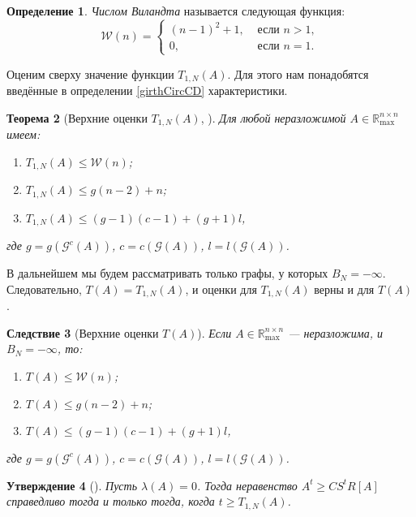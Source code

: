 \documentclass[12pt]{article}
\newtheorem{theorem}{Теорема}[section]
\newtheorem{proposition}[theorem]{Утверждение}
\newtheorem{corollary}[theorem]{Следствие}
\theoremstyle{definition}
\newtheorem{definition}[theorem]{Определение}
\begin{document}
\begin{definition}
\textit{Числом Виландта} называется следующая функция:
\begin{equation*}
\mathcal{W}(n) = \begin{cases}
(n - 1)^2 + 1, &\text{ если } n > 1, \\
0, & \text{ если } n = 1.
\end{cases}
\end{equation*}
\end{definition}

Оценим сверху значение функции $T_{1, N}(A)$. Для этого нам понадобятся введённые в определении \ref{girthCircCD} характеристики.

\begin{theorem} [Верхние оценки $T_{1, N}(A)$, {\cite[теорема 4.1]{15WeakCSRExpantion}}]

Для любой неразложимой $A \in \mathbb{R}_{\max}^{n \times n}$ имеем:
\begin{enumerate} 
    \item $T_{1, N}(A) \le \mathcal{W}(n)$;
    \item $T_{1, N}(A) \le g(n - 2) + n$;
    \item $T_{1, N}(A) \le (g - 1)(c - 1) + (g + 1) l$,
\end{enumerate}
где $g = g(\mathcal{G}^c(A))$, $c = c(\mathcal{G}(A))$, $l = l(\mathcal{G}(A))$.
\end{theorem}

В дальнейшем мы будем рассматривать только графы, у которых $B_N = -\infty$. Следовательно, $T(A) = T_{1, N}(A)$, и оценки для $T_{1, N}(A)$ верны и для $T(A)$.

\begin{corollary} [Верхние оценки $T(A)$]
\label{upperBounds}
Если $A \in \mathbb{R}_{\max}^{n \times n}$ --- неразложима, и $B_N = -\infty$, то:
\begin{enumerate} 
    \item $T(A) \le \mathcal{W}(n)$;
    \item $T(A) \le g(n - 2) + n$;
    \item $T(A) \le (g - 1)(c - 1) + (g + 1) l$,
\end{enumerate}
где $g = g(\mathcal{G}^c(A))$, $c = c(\mathcal{G}(A))$, $l = l(\mathcal{G}(A))$.
\end{corollary}

\begin{proposition} [{\cite[лемма 2.3]{bounds}}]
\label{findT1}
Пусть $\lambda(A) = 0$. Тогда неравенство $A^t \ge CS^tR[A]$ справедливо тогда и только тогда, когда $t \ge T_{1,N}(A)$.
\end{proposition}
\end{document}
